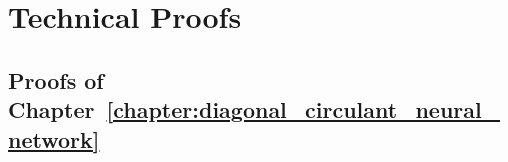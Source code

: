 \chapter{Technical Proofs}
\label{chapter:technical_proofs}
\localtableofcontents

\section{Proofs of Chapter~\ref{chapter:diagonal_circulant_neural_network}}



